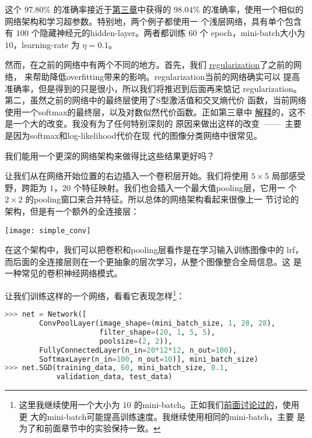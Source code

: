 这个 $97.80$\% 的准确率接近于\hyperref[chap3_98_04_percent]{第三章}中获得的
$98.04$\% 的准确率，使用一个相似的网络架构和学习超参数。特别地，两个例子都使用一
个浅层网络，具有单个包含有 $100$ 个隐藏神经元的\gls*{hidden-layer}。两者都训练 $60$ 个
\gls*{epoch}，\gls*{mini-batch}大小为 $10$，\gls*{learning-rate} 为 $\eta = 0.1$。

然而，在之前的网络中有两个不同的地方。首先，我们%
\hyperref[sec:overfitting_and_regularization]{\gls*{regularization}}了之前的网络，
来帮助降低\gls*{overfitting}带来的影响。\gls*{regularization}当前的网络确实可以
提高准确率，但是得到的只是很小，所以我们将推迟到后面再来惦记%
\gls*{regularization}。第二，虽然之前的网络中的最终层使用了S型激活值和交叉熵代价
函数，当前网络使用一个\gls*{softmax}的最终层，以及对数似然代价函数。正如第三章中%
\hyperref[subsec:softmax]{解释}的，这不是一个大的改变。我没有为了任何特别深刻的
原因来做出这样的改变~——~主要是因为\gls*{softmax}和\gls*{log-likelihood}代价在现
代的图像分类网络中很常见。

我们能用一个更深的网络架构来做得比这些结果更好吗？

让我们从在网络开始位置的右边插入一个卷积层开始。我们将使用 $5 \times 5$ 局部感受
野，跨距为 $1$，$20$ 个特征映射。我们也会插入一个最大值\gls*{pooling}层，它用一
个 $2 \times 2$ 的\gls*{pooling}窗口来合并特征。所以总体的网络架构看起来很像上一
节讨论的架构，但是有一个额外的全连接层：
\begin{center}
  \texttt{[image: simple\_conv]}  
\end{center}

在这个架构中，我们可以把卷积和\gls*{pooling}层看作是在学习输入训练图像中的%
\gls*{lrf}，而后面的全连接层则在一个更抽象的层次学习，从整个图像整合全局信息。这
是一种常见的卷积神经网络模式。

让我们训练这样的一个网络，看看它表现怎样\footnote{这里我继续使用一个大小为 $10$
  的\gls*{mini-batch}。正如我们\hyperref[mini_batch_size]{前面讨论过的}，使用更
  大的\gls*{mini-batch}可能提高训练速度。我继续使用相同的\gls*{mini-batch}，主要
  是为了和前面章节中的实验保持一致。}：
\begin{lstlisting}[language=Python]
>>> net = Network([
        ConvPoolLayer(image_shape=(mini_batch_size, 1, 28, 28), 
                      filter_shape=(20, 1, 5, 5), 
                      poolsize=(2, 2)),
        FullyConnectedLayer(n_in=20*12*12, n_out=100),
        SoftmaxLayer(n_in=100, n_out=10)], mini_batch_size)
>>> net.SGD(training_data, 60, mini_batch_size, 0.1, 
            validation_data, test_data)
\end{lstlisting}

